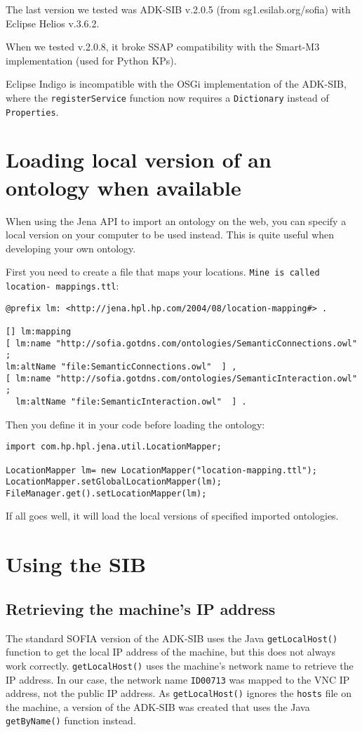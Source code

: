 The last version we tested was ADK-SIB v.2.0.5 (from sg1.esilab.org/sofia) with Eclipse Helios v.3.6.2.

When we tested v.2.0.8, it broke SSAP compatibility with the Smart-M3 implementation (used for Python KPs).

Eclipse Indigo is incompatible with the OSGi implementation of the ADK-SIB, where the \texttt{registerService} function now requires a \texttt{Dictionary} instead of \texttt{Properties}.

\section{Loading local version of an ontology when available}

When using the Jena API to import an ontology on the web, you can specify a local version on your computer to be used instead. This is quite useful when developing your own ontology.

First you need to create a file that maps your locations. \texttt{Mine is called location- 
mappings.ttl}: 

\begin{verbatim}
@prefix lm: <http://jena.hpl.hp.com/2004/08/location-mapping#> . 

[] lm:mapping 
[ lm:name "http://sofia.gotdns.com/ontologies/SemanticConnections.owl" ; 
lm:altName "file:SemanticConnections.owl"  ] , 
[ lm:name "http://sofia.gotdns.com/ontologies/SemanticInteraction.owl" ; 
  lm:altName "file:SemanticInteraction.owl"  ] . 
\end{verbatim}

Then you define it in your code before loading the ontology: 

\begin{verbatim}
import com.hp.hpl.jena.util.LocationMapper; 

LocationMapper lm= new LocationMapper("location-mapping.ttl"); 
LocationMapper.setGlobalLocationMapper(lm); 
FileManager.get().setLocationMapper(lm);
\end{verbatim}

If all goes well, it will load the local versions of specified imported ontologies.

\section{Using the SIB}

\subsection{Retrieving the machine's IP address}
The standard SOFIA version of the ADK-SIB uses the Java \texttt{getLocalHost()} function to get the local IP address of the machine, but this does not always work correctly. \texttt{getLocalHost()} uses the machine's network name to retrieve the IP address. In our case, the network name \texttt{ID00713} was mapped to the VNC IP address, not the public IP address. As \texttt{getLocalHost()} ignores the \texttt{hosts} file on the machine, a version of the ADK-SIB was created that uses the Java \texttt{getByName()} function instead.


